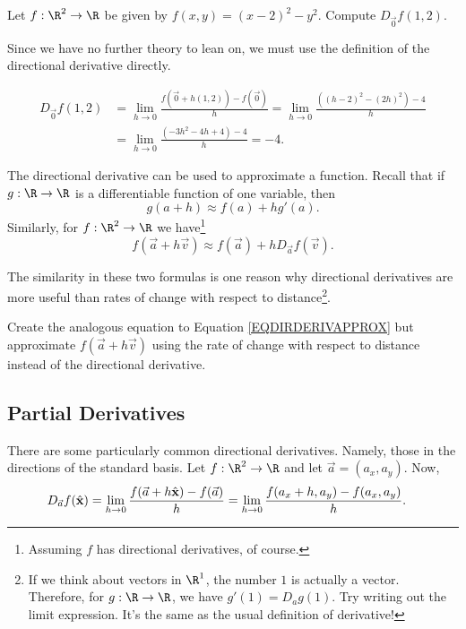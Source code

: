 \begin{example}
	Let $f:\R^2\to\R$ be given by $f(x,y)=(x-2)^2-y^2$.  Compute $D_{\vec 0}f(1,2)$.

	Since we have no further theory to lean on, we must use the definition of the directional
	derivative directly.

	\begin{align*}
		D_{\vec 0}f(1,2) &= \lim_{h\to0}\frac{f(\vec 0+h(1,2))-f(\vec 0)}{h}
		=\lim_{h\to0}\frac{((h-2)^2-(2h)^2)-4}{h}\\
		&=\lim_{h\to0}\frac{(-3h^2-4h+4)-4}{h}=-4.
	\end{align*}
\end{example}

The directional derivative can be used to approximate a function.  Recall that if $g:\R\to\R$ is
a differentiable function of one variable, then
\[
	g(a+h)\approx f(a) + hg'(a).
\]
Similarly, for $f:\R^2\to\R$ we have\footnote{ Assuming $f$ has directional derivatives, of course.}
\begin{equation}
	\label{EQDIRDERIVAPPROX}
	f(\vec a+h\vec v)\approx f(\vec a)+hD_{\vec a}f(\vec v).
\end{equation}

The similarity in these two formulas is one reason
why directional derivatives are more useful than rates of change with respect to distance\footnote{
	If we think about vectors in $\R^1$, the number $1$ is actually a vector.  Therefore,
	for $g:\R\to\R$, we have $g'(1)=D_{a}g(1)$.  Try writing out the limit expression.  It's the same
	as the usual definition of derivative!
	}.

\begin{exercise}
	Create the analogous equation to Equation \eqref{EQDIRDERIVAPPROX} but approximate
	$f(\vec a+h\vec v)$ using the rate of change with respect to distance instead of the
	directional derivative.
\end{exercise}


\subsection{Partial Derivatives}
There are some particularly common directional derivatives.  Namely, those in the directions
of the standard basis.  Let $f:\R^2\to\R$ and let $\vec a=(a_x,a_y)$.  Now,
\begin{align*}
	D_{\vec a}f({\hat {\mathbf x}}) &= \lim_{h\to0}\frac{f(\vec a+h{\hat {\mathbf x}})-f(\vec a)}{h}
	=\lim_{h\to0}\frac{f(a_x+h, a_y)-f(a_x,a_y)}{h}.
\end{align*}

